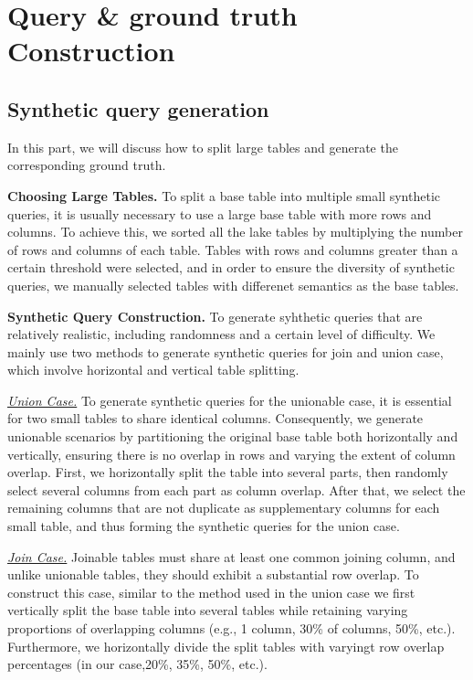 \section{Query \& ground truth Construction}

\subsection{Synthetic query generation}
In this part, we will discuss how to split large tables and generate the corresponding ground truth.

\noindent \textbf{Choosing Large Tables.} 
To split a base table into multiple small synthetic queries, it is usually necessary to use a large base table with more rows and columns. To achieve this, we sorted all the lake tables by multiplying the number of rows and columns of each table. Tables with rows and columns greater than a certain threshold were selected, and in order to ensure the diversity of synthetic queries, we manually selected tables with differenet semantics as the base tables.

\noindent \textbf{Synthetic Query Construction.} 
To generate syhthetic queries that are relatively realistic, including randomness and a certain level of difficulty. We mainly use two methods to generate synthetic queries for join and union case, which involve horizontal and vertical table splitting.

\noindent \underline{\textit{Union Case.}}  To generate synthetic queries for the unionable case, it is essential for two small tables to share identical columns. Consequently, we generate unionable scenarios by partitioning the original base table both horizontally and vertically, ensuring there is no overlap in rows and varying the extent of column overlap. First, we horizontally split the table into several parts, then randomly select several columns from each part as column overlap. After that, we select the remaining columns that are not duplicate as supplementary columns for each small table, and thus forming the synthetic queries for the union case.

\noindent \underline{\textit{Join Case.}}  Joinable tables must share at least one common joining column, and unlike unionable tables, they should exhibit a substantial row overlap. To construct this case, similar to the method used in the union case we first vertically split the base table into several tables while retaining varying proportions of overlapping columns (e.g., 1 column, 30\% of columns, 50\%, etc.). Furthermore, we horizontally divide the split tables with varyingt row overlap percentages (in our case,20\%, 35\%, 50\%, etc.). 

